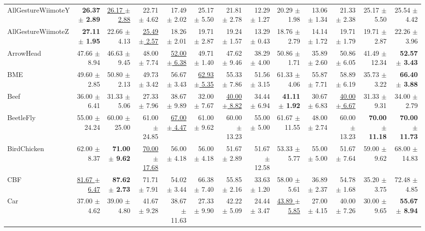 \begin{landscape}
\begin{longtable}{lrrrrrrrrrrrr}
AllGestureWiimoteY & \textbf{26.37 $\pm$ 2.89} & \underline{26.17 $\pm$ 2.88} & 22.71 $\pm$ 4.62 & 17.49 $\pm$ 2.02 & 25.17 $\pm$ 5.50 & 21.81 $\pm$ 2.78 & 12.29 $\pm$ 1.27 & 20.29 $\pm$ 1.98 & 13.06 $\pm$ 1.34 & 21.33 $\pm$ 2.38 & 25.17 $\pm$ 5.50 & 25.54 $\pm$ 4.42 \\
AllGestureWiimoteZ & \textbf{27.11 $\pm$ 1.95} & 22.66 $\pm$ 4.13 & \underline{25.49 $\pm$ 2.57} & 18.26 $\pm$ 2.01 & 19.71 $\pm$ 2.87 & 19.24 $\pm$ 1.57 & 13.29 $\pm$ 0.43 & 18.76 $\pm$ 2.79 & 14.14 $\pm$ 1.72 & 19.71 $\pm$ 1.79 & 19.71 $\pm$ 2.87 & 22.26 $\pm$ 3.96 \\
ArrowHead & 47.66 $\pm$ 8.94 & 46.63 $\pm$ 9.45 & 48.00 $\pm$ 7.74 & \underline{52.00 $\pm$ 6.38} & 49.71 $\pm$ 1.40 & 47.62 $\pm$ 9.46 & 38.29 $\pm$ 4.00 & 50.86 $\pm$ 1.71 & 35.89 $\pm$ 2.60 & 50.86 $\pm$ 6.05 & 41.49 $\pm$ 12.34 & \textbf{52.57 $\pm$ 3.43} \\
BME & 49.60 $\pm$ 2.85 & 50.80 $\pm$ 2.13 & 49.73 $\pm$ 3.42 & 56.67 $\pm$ 3.43 & \underline{62.93 $\pm$ 5.35} & 55.33 $\pm$ 7.86 & 51.56 $\pm$ 3.15 & 61.33 $\pm$ 4.06 & 55.87 $\pm$ 7.71 & 58.89 $\pm$ 6.19 & 35.73 $\pm$ 3.22 & \textbf{66.40 $\pm$ 3.88} \\
Beef & 36.00 $\pm$ 6.41 & 31.33 $\pm$ 5.06 & 27.33 $\pm$ 7.96 & 38.67 $\pm$ 9.89 & 32.00 $\pm$ 7.67 & \underline{40.00 $\pm$ 8.82} & 34.44 $\pm$ 6.94 & \textbf{41.11 $\pm$ 1.92} & 30.67 $\pm$ 6.83 & \underline{40.00 $\pm$ 6.67} & 31.33 $\pm$ 9.31 & 34.00 $\pm$ 2.79 \\
BeetleFly & 55.00 $\pm$ 24.24 & 60.00 $\pm$ 25.00 & 61.00 $\pm$ 24.85 & \underline{67.00 $\pm$ 4.47} & 61.00 $\pm$ 9.62 & 60.00 $\pm$ 13.23 & 55.00 $\pm$ 5.00 & 61.67 $\pm$ 11.55 & 48.00 $\pm$ 2.74 & 60.00 $\pm$ 13.23 & \textbf{70.00 $\pm$ 11.18} & \textbf{70.00 $\pm$ 11.73} \\
BirdChicken & 62.00 $\pm$ 8.37 & \textbf{71.00 $\pm$ 9.62} & \underline{70.00 $\pm$ 17.68} & 56.00 $\pm$ 4.18 & 56.00 $\pm$ 4.18 & 51.67 $\pm$ 2.89 & 51.67 $\pm$ 12.58 & 53.33 $\pm$ 5.77 & 55.00 $\pm$ 5.00 & 51.67 $\pm$ 7.64 & 59.00 $\pm$ 9.62 & 68.00 $\pm$ 14.83 \\
CBF & \underline{81.67 $\pm$ 6.47} & \textbf{87.62 $\pm$ 2.73} & 71.71 $\pm$ 7.91 & 54.02 $\pm$ 3.44 & 66.38 $\pm$ 7.40 & 55.85 $\pm$ 2.16 & 33.63 $\pm$ 1.20 & 58.00 $\pm$ 5.61 & 36.89 $\pm$ 2.37 & 54.78 $\pm$ 1.68 & 35.20 $\pm$ 3.75 & 72.48 $\pm$ 4.85 \\
Car & 37.00 $\pm$ 4.62 & 39.00 $\pm$ 4.80 & 41.67 $\pm$ 9.28 & 38.67 $\pm$ 11.63 & 27.33 $\pm$ 9.90 & 42.22 $\pm$ 5.09 & 24.44 $\pm$ 3.47 & \underline{43.89 $\pm$ 5.85} & 27.00 $\pm$ 4.15 & 40.00 $\pm$ 7.26 & 30.00 $\pm$ 9.65 & \textbf{55.67 $\pm$ 8.94} \\

\end{longtable}
\end{landscape}
